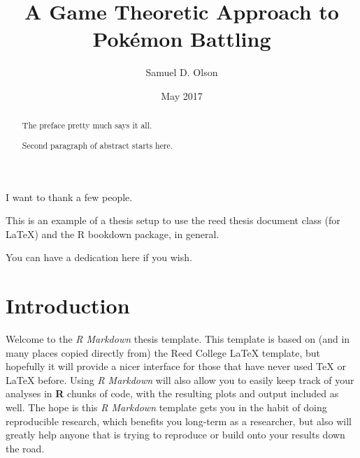 \documentclass[12pt,twoside]{reedthesis}
\title{A Game Theoretic Approach to Pokémon Battling}
\author{Samuel D. Olson}
\date{May 2017}
\begin{document}
      \maketitle
  
  \frontmatter %
  \pagestyle{empty} %

      \begin{acknowledgements}
      I want to thank a few people.
    \end{acknowledgements}
  
      \begin{preface}
      This is an example of a thesis setup to use the reed thesis document
      class (for LaTeX) and the R bookdown package, in general.
    \end{preface}
  
      \hypersetup{linkcolor=black}
    \setcounter{tocdepth}{2}
    \tableofcontents
  
      \listoftables
  
      \listoffigures
  
      \begin{abstract}
      The preface pretty much says it all. \par  Second paragraph of abstract
      starts here.
    \end{abstract}
  
      \begin{dedication}
      You can have a dedication here if you wish.
    \end{dedication}
  
  \mainmatter %
  \pagestyle{fancyplain} %

  \chapter*{Introduction}\label{introduction}
  
  Welcome to the \emph{R Markdown} thesis template. This template is based
  on (and in many places copied directly from) the Reed College LaTeX
  template, but hopefully it will provide a nicer interface for those that
  have never used TeX or LaTeX before. Using \emph{R Markdown} will also
  allow you to easily keep track of your analyses in \textbf{R} chunks of
  code, with the resulting plots and output included as well. The hope is
  this \emph{R Markdown} template gets you in the habit of doing
  reproducible research, which benefits you long-term as a researcher, but
  also will greatly help anyone that is trying to reproduce or build onto
  your results down the road.
  
\end{document}
